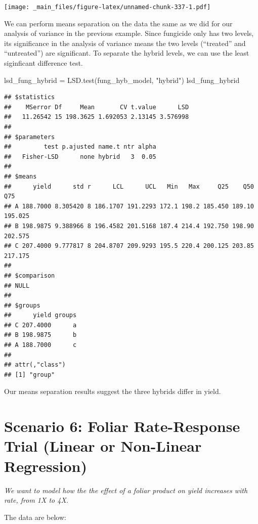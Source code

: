 \documentclass[
]{book}
\newenvironment{Shaded}{\begin{snugshade}}{\end{snugshade}}
\newcommand{\FunctionTok}[1]{\textcolor[rgb]{0.00,0.00,0.00}{#1}}
\newcommand{\NormalTok}[1]{#1}
\newcommand{\OtherTok}[1]{\textcolor[rgb]{0.56,0.35,0.01}{#1}}
\newcommand{\StringTok}[1]{\textcolor[rgb]{0.31,0.60,0.02}{#1}}
\begin{document}
\texttt{[image: \_main\_files/figure-latex/unnamed-chunk-337-1.pdf]}

We can perform means separation on the data the same as we did for our analysis of variance in the previous example. Since fungicide only has two levels, its significance in the analysis of variance means the two levels (``treated'' and ``untreated'') are significant. To separate the hybrid levels, we can use the least siginficant difference test.

\begin{Shaded}
\begin{Highlighting}[]
\NormalTok{lsd\_fung\_hybrid }\OtherTok{=} \FunctionTok{LSD.test}\NormalTok{(fung\_hyb\_model, }\StringTok{"hybrid"}\NormalTok{)}
\NormalTok{lsd\_fung\_hybrid}
\end{Highlighting}
\end{Shaded}

\begin{verbatim}
## $statistics
##    MSerror Df     Mean       CV t.value      LSD
##   11.26542 15 198.3625 1.692053 2.13145 3.576998
## 
## $parameters
##         test p.ajusted name.t ntr alpha
##   Fisher-LSD      none hybrid   3  0.05
## 
## $means
##      yield      std r      LCL      UCL   Min   Max     Q25    Q50     Q75
## A 188.7000 8.305420 8 186.1707 191.2293 172.1 198.2 185.450 189.10 195.025
## B 198.9875 9.388966 8 196.4582 201.5168 187.4 214.4 192.750 198.90 202.575
## C 207.4000 9.777817 8 204.8707 209.9293 195.5 220.4 200.125 203.85 217.175
## 
## $comparison
## NULL
## 
## $groups
##      yield groups
## C 207.4000      a
## B 198.9875      b
## A 188.7000      c
## 
## attr(,"class")
## [1] "group"
\end{verbatim}

Our means separation results suggest the three hybrids differ in yield.

\hypertarget{scenario-6-foliar-rate-response-trial-linear-or-non-linear-regression}{%
\section{Scenario 6: Foliar Rate-Response Trial (Linear or Non-Linear Regression)}\label{scenario-6-foliar-rate-response-trial-linear-or-non-linear-regression}}

\emph{We want to model how the the effect of a foliar product on yield increases with rate, from 1X to 4X.}

The data are below:
\end{document}
